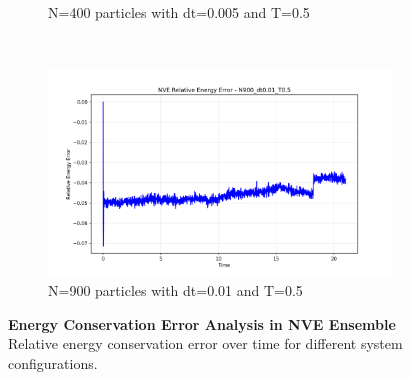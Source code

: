 \begin{figure}[H]
\begin{subfigure}{0.45\textwidth}
		\caption{N=400 particles with dt=0.005 and T=0.5}
		\label{sfig:error_N400_dt0005}
	\end{subfigure}%
	~
\begin{subfigure}{0.45\textwidth}
		\includegraphics[width=\textwidth]{media/error_N900_dt0.01_T0.5.png}
		\caption{N=900 particles with dt=0.01 and T=0.5}
		\label{sfig:error_N900}
	\end{subfigure}%

	\caption{\textbf{Energy Conservation Error Analysis in NVE Ensemble} 
	Relative energy conservation error over time for different system configurations.}
	\label{fig:energy_error}
\end{figure}

